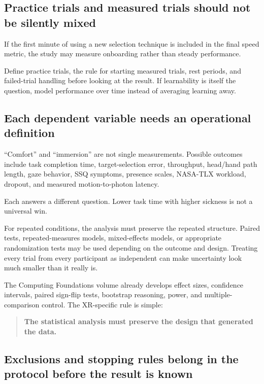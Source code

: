 \subsection{Practice trials and measured trials should not be silently mixed}\label{04-visual-computing-ii-ch035-practice-trials-and-measured-trials-should-not-be-silently-mixed}

If the first minute of using a new selection technique is included in the final speed metric, the study may measure onboarding rather than steady performance.

Define practice trials, the rule for starting measured trials, rest periods, and failed-trial handling before looking at the result. If learnability is itself the question, model performance over time instead of averaging learning away.

\subsection{Each dependent variable needs an operational definition}\label{04-visual-computing-ii-ch035-each-dependent-variable-needs-an-operational-definition}

``Comfort'' and ``immersion'' are not single measurements. Possible outcomes include task completion time, target-selection error, throughput, head/hand path length, gaze behavior, SSQ symptoms, presence scales, NASA-TLX workload, dropout, and measured motion-to-photon latency.

Each answers a different question. Lower task time with higher sickness is not a universal win.

For repeated conditions, the analysis must preserve the repeated structure. Paired tests, repeated-measures models, mixed-effects models, or appropriate randomization tests may be used depending on the outcome and design. Treating every trial from every participant as independent can make uncertainty look much smaller than it really is.

The Computing Foundations volume already develops effect sizes, confidence intervals, paired sign-flip tests, bootstrap reasoning, power, and multiple-comparison control. The XR-specific rule is simple:

\begin{quote}
\textbf{The statistical analysis must preserve the design that generated the data.}
\end{quote}

\subsection{Exclusions and stopping rules belong in the protocol before the result is known}\label{04-visual-computing-ii-ch035-exclusions-and-stopping-rules-belong-in-the-protocol-before-the-result-is-known}

